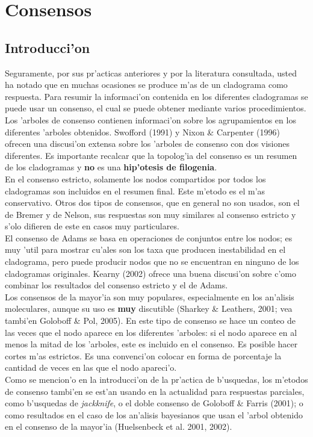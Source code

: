 \chapter{Consensos}
\section*{Introducci'on}
Seguramente, por sus pr'acticas anteriores y por la literatura consultada, usted ha notado que en muchas ocasiones se produce m'as de un cladograma como respuesta. Para resumir la informaci'on contenida en los diferentes cladogramas se puede usar un consenso, el cual se puede obtener mediante varios procedimientos. Los 'arboles de consenso contienen informaci'on sobre los agrupamientos en los diferentes 'arboles obtenidos. Swofford (1991) y Nixon \& Carpenter (1996) ofrecen una discusi'on extensa sobre los 'arboles de consenso con dos visiones diferentes. Es importante recalcar que la topolog'ia del consenso es un resumen de los cladogramas y \textbf{no} es una \textbf{hip'otesis de filogenia}.\\

En el consenso estricto, solamente los nodos compartidos por todos los cladogramas son incluidos en el resumen final. Este m'etodo es el m'as conservativo. Otros dos tipos de consensos, que en general no son usados, son el de Bremer y de Nelson, sus respuestas son muy similares al consenso estricto y s'olo difieren de este en casos muy particulares.\\
El consenso de Adams se basa en operaciones de conjuntos entre los nodos; es muy 'util para mostrar cu'ales son los taxa que producen inestabilidad en el cladograma, pero puede producir nodos que no se encuentran en ninguno de los cladogramas originales. Kearny (2002) ofrece una buena discusi'on sobre c'omo combinar los resultados del consenso estricto y el de Adams.\\
Los consensos de la mayor'ia son muy populares, especialmente en los an'alisis moleculares, aunque su uso es \textbf{muy} discutible (Sharkey \& Leathers, 2001; vea tambi'en Goloboff \& Pol, 2005). En este tipo de consenso se hace un conteo de las veces que el nodo aparece en los diferentes 'arboles: si el nodo aparece en al menos la mitad de los 'arboles, este es incluido en el consenso. Es posible hacer cortes m'as estrictos. Es una convenci'on colocar en forma de porcentaje la cantidad de veces en las que el nodo apareci'o.\\
Como se mencion'o en la introducci'on de la pr'actica de b'usquedas, los m'etodos de consenso tambi'en se est'an usando en la actualidad para respuestas parciales, como b'usquedas de \textit{jackknife}, o el doble consenso de Goloboff \& Farris (2001); o como resultados en el caso de los an'alisis bayesianos que usan el 'arbol obtenido en el consenso de la mayor'ia (Huelsenbeck et al. 2001, 2002).
